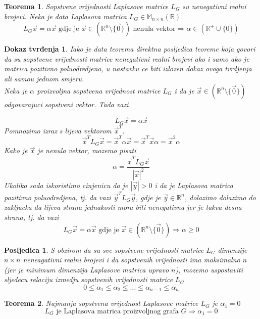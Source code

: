 \documentclass[11pt]{article}
\newtheorem{theorem}{Teorema}
\newtheorem*{custom_proof}{Dokaz tvrđenja}
\newtheorem{consequence}{Posljedica}
\begin{document}
	\begin{theorem} Sopstvene vrijednosti Laplasove matrice $L_G$ su nenegativni realni brojevi.
	Neka je data Laplasova matrica $L_G \in  \mathbb{M}_{n \times n}(\mathbb{R})$.
	\[
	 L_G\vec{x} = \alpha \vec{x} \text{ gdje je } \vec{x} \in ( \mathbb{R}^n \setminus \{\vec{0}\}) \text{ nenula vektor} \Rightarrow \alpha \in (\mathbb{R}^+ \cup \{0\})
	\]
	\end{theorem}
	
	\begin{custom_proof}
	Iako je data teorema direktna posljedica teoreme koja govori da su sopstvene vrijednosti matrice nenegativni realni brojevi ako i samo ako je matrica pozitivno poluodredjena, u nastavku ce biti izlozen dokaz ovoga tvrdjenja ali samou jednom smjeru. \\
	
	Neka je $\alpha$ proizvoljna sopstvena vrijednost matrice $L_G$ i da je $\vec{x} \in (\mathbb{R}^n \setminus \{\vec{0}\})$ odgovarajuci sopstveni vektor. Tada vazi
	
	\[
		L_G\vec{x} = \alpha \vec{x}
	\]
	Pomnozimo izraz s lijeva vektorom $\vec{x}^T$.
	\[
		\vec{x}^TL_G\vec{x} = \vec{x}^T\alpha \vec{x} = \vec{x}^T \vec{x} \alpha = \vec{x}^2 \alpha 
	\]
	Kako je $\vec{x}$ je nenula vektor, mozemo pisati
	\[
	 \alpha = \frac{\vec{x}^TL_G\vec{x}}{|\vec{x}|^2}
	\]
	Ukoliko sada iskoristimo cinjenicu da je $|\vec{y}| > 0$ i da je Laplasova matrica pozitivno poluodredjena, tj. da vazi $\vec{y}^TL_G\vec{y}$, gdje je $\vec{y} \in \mathbb{R}^n$, dolazimo dolazimo do zakljucka da lijeva strana jednakosti mora biti nenegativna jer je takva desna strana, tj. da vazi
	\[
		L_G\vec{x} = \alpha \vec{x} \text{ gdje je } \vec{x} \in (\mathbb{R}^n \setminus \{\vec{0}\}) \Rightarrow \alpha \geq 0
	\] 
	\end{custom_proof}
	
	\begin{consequence}
	S obzirom da su sve sopstvene vrijednosti matrice $L_G$ dimenzije $n \times n$ neneagativni realni brojevi i da sopstvenih vrijednosti ima maksimalno $n$ (jer je minimum dimenzija Laplasove matrica upravo $n$), mozemo uspostaviti sljedecu relaciju izmedju sopstvenih vrijednosti matrice $L_G$ 
	\[
	0 \leq \alpha_1 \leq \alpha_2 \leq \dots \leq \alpha_{n-1} \leq \alpha_n
	\]
	\end{consequence}
	
	\begin{theorem} Najmanja sopstvena vrijednost Laplasove matrice $L_G$ je $\alpha_1=0$
	\[
	L_G \text{ je Laplasova matrica proizvoljnog grafa } G \Rightarrow \alpha_1=0
	\]
	\end{theorem}
	
\end{document}
